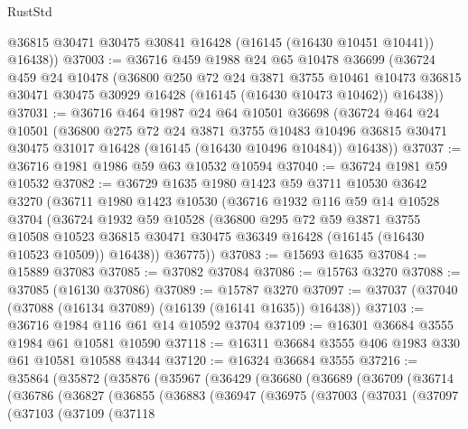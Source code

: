 \begin{lexlean}{RustStd}
\begin{coremodule}
        @36815
        @30471
        @30475
        @30841
        @16428
        (@16145 (@16430 @10451 @10441))
        @16438))
@37003 := @36716
    @459
    @1988
    @24
    @65
    @10478
    @36699
    (@36724
      @459
      @24
      @10478
      (@36800
        @250
        @72
        @24
        @3871
        @3755
        @10461
        @10473
        @36815
        @30471
        @30475
        @30929
        @16428
        (@16145 (@16430 @10473 @10462))
        @16438))
@37031 := @36716
    @464
    @1987
    @24
    @64
    @10501
    @36698
    (@36724
      @464
      @24
      @10501
      (@36800
        @275
        @72
        @24
        @3871
        @3755
        @10483
        @10496
        @36815
        @30471
        @30475
        @31017
        @16428
        (@16145 (@16430 @10496 @10484))
        @16438))
@37037 := @36716 @1981 @1986 @59 @63 @10532 @10594
@37040 := @36724 @1981 @59 @10532
@37082 := @36729
    @1635
    @1980
    @1423
    @59
    @3711
    @10530
    @3642
    @3270
    (@36711
      @1980
      @1423
      @10530
      (@36716
        @1932
        @116
        @59
        @14
        @10528
        @3704
        (@36724
          @1932
          @59
          @10528
          (@36800
            @295
            @72
            @59
            @3871
            @3755
            @10508
            @10523
            @36815
            @30471
            @30475
            @36349
            @16428
            (@16145 (@16430 @10523 @10509))
            @16438))
        @36775))
@37083 := @15693 @1635
@37084 := @15889 @37083
@37085 := @37082 @37084
@37086 := @15763 @3270
@37088 := @37085 (@16130 @37086)
@37089 := @15787 @3270
@37097 := @37037 (@37040 (@37088 (@16134 @37089) (@16139 (@16141 @1635)) @16438))
@37103 := @36716 @1984 @116 @61 @14 @10592 @3704
@37109 := @16301 @36684 @3555 @1984 @61 @10581 @10590
@37118 := @16311 @36684 @3555 @406 @1983 @330 @61 @10581 @10588 @4344
@37120 := @16324 @36684 @3555
@37216 := @35864
    (@35872
      (@35876
        (@35967
          (@36429
            (@36680
              (@36689
                (@36709
                  (@36714
                    (@36786
                      (@36827
                        (@36855
                          (@36883
                            (@36947
                              (@36975
                                (@37003
                                  (@37031
                                    (@37097
                                      (@37103
                                        (@37109
                                          (@37118

\end{coremodule}
\end{lexlean}

